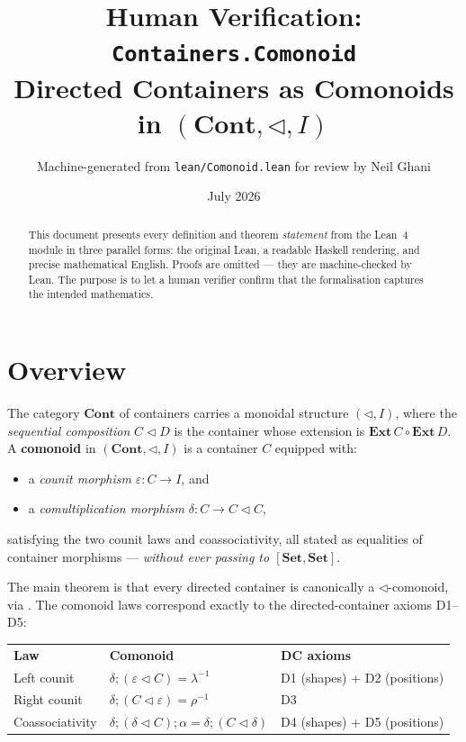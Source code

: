 \documentclass[11pt,a4paper]{article}
\title{Human Verification: \texttt{Containers.Comonoid}\\[4pt]
  \large Directed Containers as Comonoids in $(\mathbf{Cont}, \triangleleft, I)$}
\author{Machine-generated from \texttt{lean/Comonoid.lean} for review by Neil Ghani}
\date{July 2026}
\begin{document}
\maketitle

\begin{abstract}
This document presents every definition and theorem \emph{statement} from the
Lean~4 module  in three parallel forms: the original
Lean, a readable Haskell rendering, and precise mathematical English.  Proofs
are omitted --- they are machine-checked by Lean.  The purpose is to let a
human verifier confirm that the formalisation captures the intended mathematics.
\end{abstract}

\tableofcontents
\bigskip

\section{Overview}

The category $\mathbf{Cont}$ of containers carries a monoidal structure
$(\triangleleft, I)$, where the \emph{sequential composition} $C \triangleleft D$
is the container whose extension is $\mathbf{Ext}\,C \circ \mathbf{Ext}\,D$.  A
\textbf{comonoid} in $(\mathbf{Cont}, \triangleleft, I)$ is a container $C$
equipped with:
\begin{itemize}
  \item a \emph{counit morphism} $\varepsilon : C \to I$, and
  \item a \emph{comultiplication morphism} $\delta : C \to C \triangleleft C$,
\end{itemize}
satisfying the two counit laws and coassociativity, all stated as equalities of
container morphisms --- \emph{without ever passing to $[\mathbf{Set},\mathbf{Set}]$}.

The main theorem is that every directed container is canonically a
$\triangleleft$-comonoid, via .  The comonoid
laws correspond exactly to the directed-container axioms D1--D5:

\begin{center}
\begin{tabular}{lll}
  \textbf{Law} & \textbf{Comonoid} & \textbf{DC axioms} \\
  Left counit  & $\delta ; (\varepsilon \triangleleft C) = \lambda^{-1}$ &
    D1 (shapes) + D2 (positions) \\
  Right counit & $\delta ; (C \triangleleft \varepsilon) = \rho^{-1}$ &
    D3 \\
  Coassociativity & $\delta ; (\delta \triangleleft C) ; \alpha = \delta ; (C \triangleleft \delta)$ &
    D4 (shapes) + D5 (positions)
\end{tabular}
\end{center}
\end{document}
